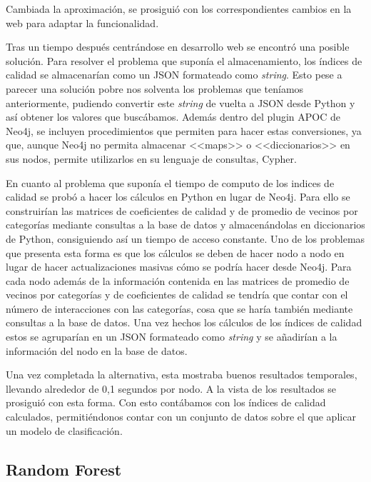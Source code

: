 Cambiada la aproximación, se prosiguió con los correspondientes cambios en la web para adaptar la funcionalidad.

Tras un tiempo después centrándose en desarrollo web se encontró una posible solución. Para resolver el problema que suponía el almacenamiento, los índices de calidad se almacenarían como un JSON formateado como \textit{string}. Esto pese a parecer una solución pobre nos solventa los problemas que teníamos anteriormente, pudiendo convertir este \textit{string} de vuelta a JSON desde Python y así obtener los valores que buscábamos. Además dentro del plugin APOC de Neo4j, se incluyen procedimientos que permiten para hacer estas conversiones, ya que, aunque Neo4j no permita almacenar <<maps>> o <<diccionarios>> en sus nodos, permite utilizarlos en su lenguaje de consultas, Cypher.

En cuanto al problema que suponía el tiempo de computo de los indices de calidad se probó a hacer los cálculos en Python en lugar de Neo4j. Para ello se construirían las matrices de coeficientes de calidad y de promedio de vecinos por categorías mediante consultas a la base de datos y almacenándolas en diccionarios de Python, consiguiendo así un tiempo de acceso constante. Uno de los problemas que presenta esta forma es que los cálculos se deben de hacer nodo a nodo en lugar de hacer actualizaciones masivas cómo se podría hacer desde Neo4j. Para cada nodo además de la información contenida en las matrices de promedio de vecinos por categorías y de coeficientes de calidad se tendría que contar con el número de interacciones con las categorías, cosa que se haría también mediante consultas a la base de datos. Una vez hechos los cálculos de los índices de calidad estos se agruparían en un JSON formateado como \textit{string} y se añadirían a la información del nodo en la base de datos.

Una vez completada la alternativa, esta mostraba buenos resultados temporales, llevando alrededor de 0,1 segundos por nodo. A la vista de los resultados se prosiguió con esta forma. Con esto contábamos con los índices de calidad calculados,
permitiéndonos contar con un conjunto de datos sobre el que aplicar un modelo de clasificación.

\subsection{Random Forest}
